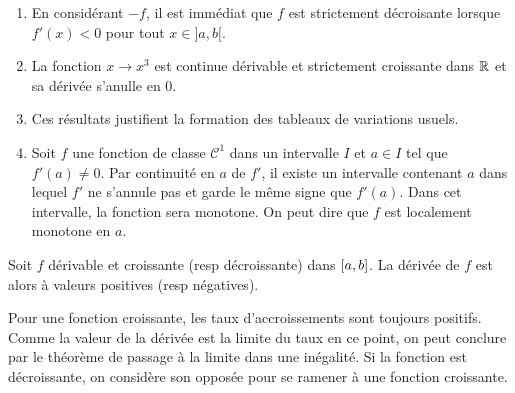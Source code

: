 \begin{rems}
 \begin{enumerate}
   \item En considérant $-f$, il est immédiat que $f$ est strictement décroisante lorsque $f'(x)<0$ pour tout $x\in]a,b[$.
   \item  La fonction $x\rightarrow x^3$ est continue dérivable et strictement croissante dans $\mathbb{R}$ et sa dérivée s'anulle en $0$.
   \item Ces résultats justifient la formation des tableaux de variations usuels.
   \item Soit $f$ une fonction de classe $\mathcal{C}^1$ dans un intervalle $I$ et $a\in I$ tel que $f'(a)\neq 0$. Par continuité en $a$ de $f'$, il existe un intervalle contenant $a$ dans lequel $f'$ ne s'annule pas et garde le même signe que $f'(a)$. Dans cet intervalle, la fonction sera monotone. On peut dire que $f$ est localement monotone en $a$.
\end{enumerate}
\end{rems}
\begin{prop}
 Soit $f$ dérivable et croissante (resp décroissante) dans $\left[ a , b \right]$. La dérivée de $f$ est alors à valeurs positives (resp négatives). 
\end{prop}
\begin{demo}
 Pour une fonction croissante, les taux d'accroissements sont toujours positifs. Comme la valeur de la dérivée est la limite du taux en ce point, on peut conclure par le théorème de passage à la limite dans une inégalité. Si la fonction est décroissante, on considère son opposée pour se ramener à une fonction croissante.
\end{demo}


